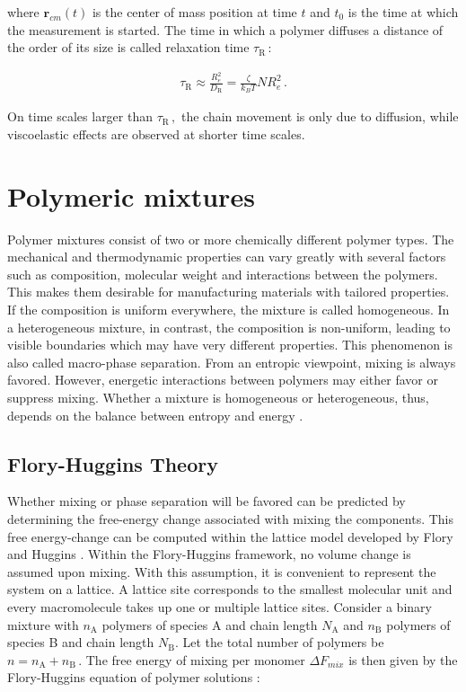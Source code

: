 \documentclass[bachelor,       %
               twoside,        %
               BCOR10mm,       %
               ngerman, english %
               ]{GAUBM}
\begin{document}
where $\mathbf r_{cm}(t)$ is the center of mass position at time $t$ and $t_0$ is the time at which the measurement is started. The time in which a polymer diffuses a distance of the order of its size is called relaxation time $\tau_\mathrm R\,$:

\begin{align}
    \tau_\mathrm R\approx\frac{R_e^2}{D_\mathrm R}=\frac{\zeta}{k_BT}{NR_e^2}\,.
\end{align}

On time scales larger than $\tau_\mathrm R\,,$ the chain movement is only due to diffusion, while viscoelastic effects are observed at shorter time scales. 
 
 
\section{Polymeric mixtures}
Polymer mixtures consist of two or more chemically different polymer types. The mechanical and thermodynamic properties can vary greatly with several factors such as composition, molecular weight and interactions between the polymers. This makes them desirable for manufacturing materials with tailored properties.\\
If the composition is uniform everywhere, the mixture is called homogeneous. In a heterogeneous mixture, in contrast, the composition is non-uniform, leading to visible boundaries which may have very different properties. This phenomenon is also called macro-phase separation. From an entropic viewpoint, mixing is always favored. However, energetic interactions between polymers may either favor or suppress mixing. Whether a mixture is homogeneous or heterogeneous, thus,  depends on the balance between entropy and energy \cite[S. 137]{Rubin03}.           

\subsection{Flory-Huggins Theory}

Whether mixing or phase separation will be favored can be predicted by determining the free-energy change associated with mixing the components. This free energy-change can be computed within the lattice model developed by Flory and Huggins \cite{Flory42}. Within the Flory-Huggins framework, no volume change is assumed upon mixing. With this assumption, it is convenient to represent the system on a lattice. A lattice site corresponds to the smallest molecular unit and every macromolecule takes up one or multiple lattice sites. Consider a binary mixture with $n_\mathrm A$ polymers of species A and chain length $N_\mathrm A$ and $n_\mathrm B$ polymers of species B and chain length $N_\mathrm B$. Let the total number of polymers be $n=n_\mathrm A+n_\mathrm B\,.$ The free energy of mixing per monomer $\Delta F_{mix}$ is then given by the Flory-Huggins equation of polymer solutions \cite[S. 143]{Rubin03}:
\end{document}
